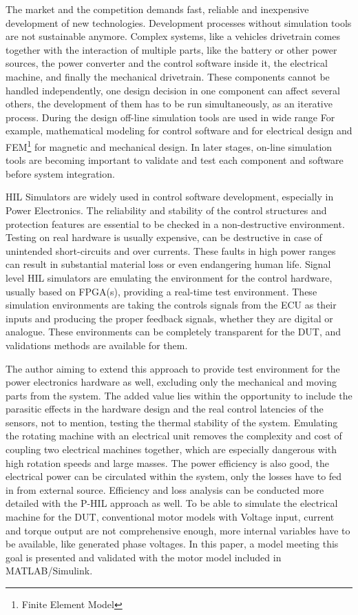 \documentclass[twoside,b5paper,10pt]{article}
\begin{document}
The market and the competition demands fast, reliable and inexpensive development of new technologies. Development processes without simulation tools are not sustainable anymore. Complex systems, like a vehicles drivetrain comes together with the interaction of multiple parts, like the battery or other power sources, the power converter and the control software inside it, the electrical machine, and finally the mechanical drivetrain. These components cannot be handled independently, one design decision in one component can affect several others, the development of them has to be run simultaneously, as an iterative process. During the design off-line simulation tools are used in wide range For example, mathematical modeling for control software and for electrical design and FEM\footnote{Finite Element Model} for magnetic and mechanical design. In later stages, on-line simulation tools are becoming important to validate and test each component and software before system integration.\cite{farkas01}\cite{buscayarol01}\cite{casestudy_volt}\cite{hwplatfromreview}

HIL Simulators are widely used in control software development, especially in Power Electronics. The reliability and stability of the control structures and protection features are essential to be checked in a non-destructive environment. Testing on real hardware is usually expensive, can be destructive in case of unintended short-circuits and over currents. These faults in high power ranges can result in substantial material loss or even endangering human life. Signal level HIL simulators are emulating the environment for the control hardware, usually based on FPGA(s), providing a real-time test environment. These simulation environments are taking the controls signals from the ECU as their inputs and producing the proper feedback signals, whether they are digital or analogue. These environments can be completely transparent for the DUT, and validations methods are available for them. \cite{koki01} \cite{koki02}

The author aiming to extend this approach to provide test environment for the power electronics hardware as well, excluding only the mechanical and moving parts from the system. The added value lies within the opportunity to include the parasitic effects in the hardware design and the real control latencies of the sensors, not to mention, testing the thermal stability of the system. Emulating the rotating machine with an electrical unit removes the complexity and cost of coupling two electrical machines together, which are especially dangerous with high rotation speeds and large masses. The power efficiency is also good, the electrical power can be circulated within the system, only the losses have to fed in from external source. Efficiency and loss analysis can be conducted more detailed with the P-HIL approach as well. To be able to simulate the electrical machine for the DUT, conventional motor models with Voltage input, current and torque output are not comprehensive enough, more internal variables have to be available, like generated phase voltages. In this paper, a model meeting this goal is presented and validated with the motor model included in MATLAB/Simulink.
\end{document}
